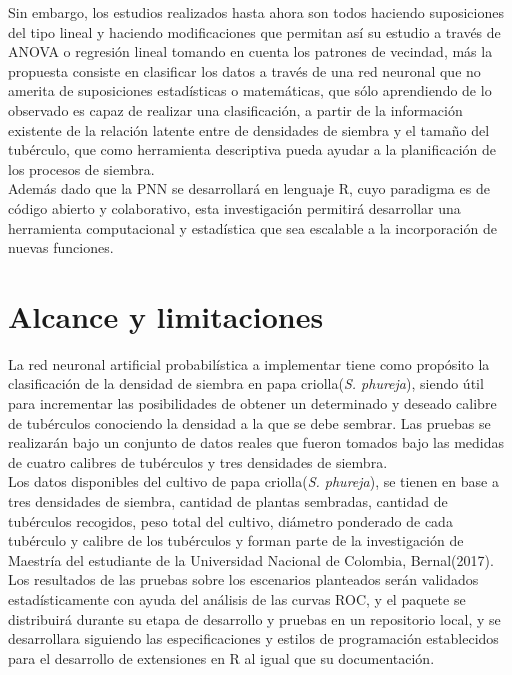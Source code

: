 Sin embargo, los estudios realizados hasta ahora son todos haciendo suposiciones del tipo lineal y haciendo modificaciones que permitan así su estudio a través de ANOVA o regresión lineal tomando en cuenta los patrones de vecindad, más la propuesta consiste en clasificar los datos a través de una red neuronal que no amerita de suposiciones estadísticas o matemáticas, que sólo aprendiendo de lo observado es capaz de realizar una clasificación, a partir de la información existente de la relación latente entre de densidades de siembra y el tamaño del tubérculo, que como herramienta descriptiva pueda ayudar  a la planificación de los procesos de siembra.\\

Además dado que la PNN se desarrollará en lenguaje R, cuyo paradigma es de código abierto y colaborativo, esta investigación permitirá desarrollar una herramienta computacional y estadística que sea escalable a la incorporación de nuevas funciones.



\section{Alcance y limitaciones}

La red neuronal artificial probabilística a implementar tiene como propósito la clasificación de la densidad de siembra en papa criolla(\textit{S. phureja}), siendo útil para incrementar las posibilidades de obtener un determinado y deseado calibre de tubérculos conociendo la densidad a la que se debe sembrar.  Las pruebas se realizarán bajo un conjunto de datos reales que fueron tomados bajo las medidas de cuatro calibres de tubérculos y tres densidades de siembra.\\

Los datos disponibles del cultivo de papa criolla(\textit{S. phureja}), se tienen en base a tres densidades de siembra, cantidad de plantas sembradas, cantidad de tubérculos recogidos, peso total del cultivo, diámetro ponderado de cada tubérculo y calibre de los tubérculos y forman parte de la investigación de Maestría del estudiante de la Universidad Nacional de Colombia, Bernal(2017).\\

Los resultados de las pruebas sobre los escenarios planteados serán validados estadísticamente con ayuda del análisis de las curvas ROC, y el paquete se distribuirá durante su etapa de desarrollo y pruebas en un repositorio local, y se desarrollara siguiendo las especificaciones y estilos de programación establecidos para el desarrollo de extensiones en R al igual que su documentación.\\

